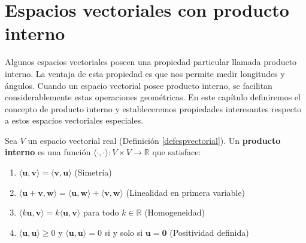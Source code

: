 \chapter{Espacios vectoriales con producto interno}\label{evcpir}

Algunos espacios vectoriales poseen una propiedad particular llamada producto interno. La ventaja de esta propiedad es que nos permite medir longitudes y ángulos. Cuando un espacio vectorial posee producto interno, se facilitan considerablemente estas operaciones geométricas. En este capítulo definiremos el concepto de producto interno y estableceremos propiedades interesantes respecto a estos espacios vectoriales especiales.

\begin{definition}
Sea $V$ un espacio vectorial real (Definición \ref{defespvectorial}). Un \textbf{producto interno} es una función $\langle \cdot, \cdot \rangle: V \times V \to \mathbb{R}$ que satisface:
\begin{enumerate}[$1.$]
    \item $\langle \mathbf{u},\mathbf{v} \rangle = \langle \mathbf{v},\mathbf{u} \rangle$ (Simetría)
    \item $\langle \mathbf{u} + \mathbf{v},\mathbf{w} \rangle = \langle \mathbf{u},\mathbf{w} \rangle + \langle \mathbf{v},\mathbf{w} \rangle$ (Linealidad en primera variable)
    \item $\langle k\mathbf{u},\mathbf{v} \rangle = k\langle \mathbf{u},\mathbf{v} \rangle$ para todo $k \in \mathbb{R}$ (Homogeneidad)
    \item $\langle \mathbf{u},\mathbf{u} \rangle \geq 0$ y $\langle \mathbf{u},\mathbf{u} \rangle = 0$ si y solo si $\mathbf{u} = \mathbf{0}$ (Positividad definida)
\end{enumerate}
\end{definition}


